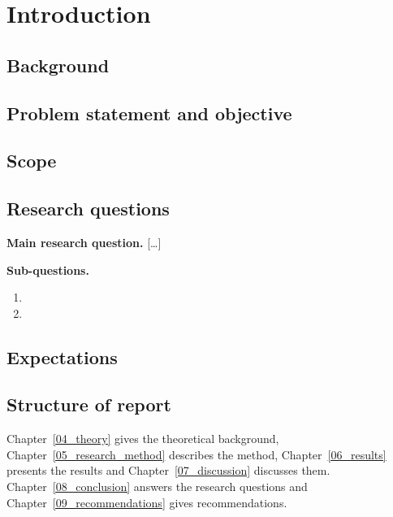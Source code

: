 \chapter{Introduction} \label{03_introduction}

\section{Background} \label{intro_background}

\section{Problem statement and objective} \label{intro_problem}

\section{Scope} \label{intro_scope}

\section{Research questions} \label{research_question}

\textbf{Main research question.} [\dots]

\textbf{Sub-questions.}
\begin{enumerate}[label=\textbf{SQ\arabic*}]
  \item [\dots]
  \item [\dots]
\end{enumerate}

\section{Expectations} \label{intro_expectations}

\section{Structure of report} \label{structure_of_report}
Chapter~\ref{04_theory} gives the theoretical background,
Chapter~\ref{05_research_method} describes the method,
Chapter~\ref{06_results} presents the results and
Chapter~\ref{07_discussion} discusses them. Chapter~\ref{08_conclusion}
answers the research questions and Chapter~\ref{09_recommendations}
gives recommendations.
